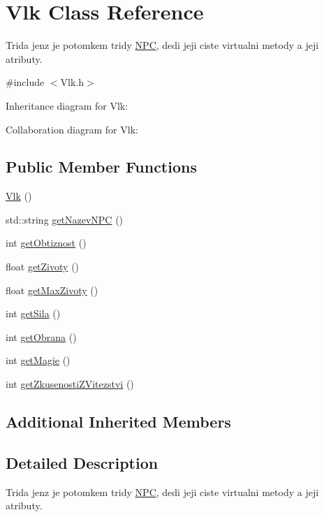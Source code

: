\hypertarget{class_vlk}{\section{Vlk Class Reference}
\label{class_vlk}
}


Trida jenz je potomkem tridy \hyperlink{class_n_p_c}{N\-P\-C}, dedi jeji ciste virtualni metody a jeji atributy.  




{\ttfamily \#include $<$Vlk.\-h$>$}



Inheritance diagram for Vlk\-:


Collaboration diagram for Vlk\-:
\subsection*{Public Member Functions}
\begin{DoxyCompactItemize}
\item 
\hyperlink{class_vlk_aea38711e8f594902db7ed843ab885f4f}{Vlk} ()
\item 
std\-::string \hyperlink{class_vlk_a4d9a2b41320baf84f24907f835951be1}{get\-Nazev\-N\-P\-C} ()
\item 
int \hyperlink{class_vlk_a8d4d8fc4e2f94d67bc829a0ed6b139eb}{get\-Obtiznost} ()
\item 
float \hyperlink{class_vlk_a5d6fa6d0468d2e09ce91b548acf73818}{get\-Zivoty} ()
\item 
float \hyperlink{class_vlk_a9d5f661751adda7584a9f07efa50d780}{get\-Max\-Zivoty} ()
\item 
int \hyperlink{class_vlk_a3a3889352370da0ab4bbfe70d4d54055}{get\-Sila} ()
\item 
int \hyperlink{class_vlk_accf315769db7678bfef439436a5508d0}{get\-Obrana} ()
\item 
int \hyperlink{class_vlk_ad24decd2d779359e30445390d0000a2f}{get\-Magie} ()
\item 
int \hyperlink{class_vlk_aa635e1c08d5a7946904b5f3885a09197}{get\-Zkusenosti\-Z\-Vitezstvi} ()
\end{DoxyCompactItemize}
\subsection*{Additional Inherited Members}


\subsection{Detailed Description}
Trida jenz je potomkem tridy \hyperlink{class_n_p_c}{N\-P\-C}, dedi jeji ciste virtualni metody a jeji atributy. 

